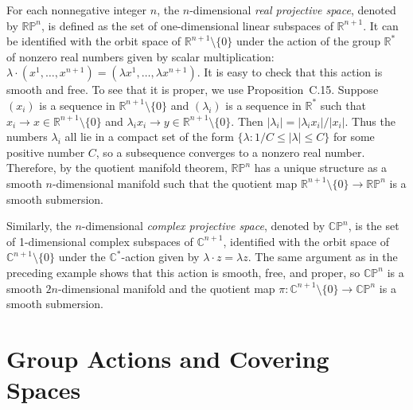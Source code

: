 \begin{example}\label{ex:real-projective-spaces}
For each nonnegative integer $n$, the $n$-dimensional \textit{real projective space}, denoted by $\mathbb{RP}^n$, is defined as the set of one-dimensional linear subspaces of $\mathbb{R}^{n+1}$. It can be identified with the orbit space of $\mathbb{R}^{n+1} \setminus \{0\}$ under the action of the group $\mathbb{R}^*$ of nonzero real numbers given by scalar multiplication: $\lambda \cdot (x^1, \ldots, x^{n+1}) = (\lambda x^1, \ldots, \lambda x^{n+1})$. It is easy to check that this action is smooth and free. To see that it is proper, we use Proposition~C.15. Suppose $(x_i)$ is a sequence in $\mathbb{R}^{n+1} \setminus \{0\}$ and $(\lambda_i)$ is a sequence in $\mathbb{R}^*$ such that $x_i \to x \in \mathbb{R}^{n+1} \setminus \{0\}$ and $\lambda_i x_i \to y \in \mathbb{R}^{n+1} \setminus \{0\}$. Then $|\lambda_i| = |\lambda_i x_i|/|x_i|$. Thus the numbers $\lambda_i$ all lie in a compact set of the form $\{\lambda : 1/C \le |\lambda| \le C\}$ for some positive number $C$, so a subsequence converges to a nonzero real number. Therefore, by the quotient manifold theorem, $\mathbb{RP}^n$ has a unique structure as a smooth $n$-dimensional manifold such that the quotient map $\mathbb{R}^{n+1} \setminus \{0\} \to \mathbb{RP}^n$ is a smooth submersion.
\end{example}

\begin{example}\label{ex:complex-projective-spaces}
Similarly, the $n$-dimensional \textit{complex projective space}, denoted by $\mathbb{CP}^n$, is the set of 1-dimensional complex subspaces of $\mathbb{C}^{n+1}$, identified with the orbit space of $\mathbb{C}^{n+1} \setminus \{0\}$ under the $\mathbb{C}^*$-action given by $\lambda \cdot z = \lambda z$. The same argument as in the preceding example shows that this action is smooth, free, and proper, so $\mathbb{CP}^n$ is a smooth $2n$-dimensional manifold and the quotient map $\pi: \mathbb{C}^{n+1} \setminus \{0\} \to \mathbb{CP}^n$ is a smooth submersion.
\end{example}

\section{Group Actions and Covering Spaces}

